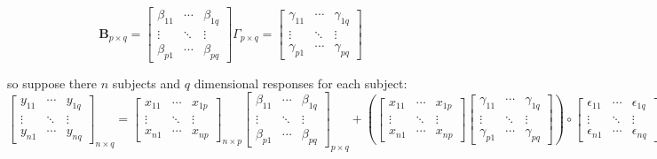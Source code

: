 \documentclass{article}
\begin{document}
\begin{displaymath}
\bm{B}_{p\times q} = 
\begin{bmatrix}
\beta_{11}& \cdots & \beta_{1q} \\
\vdots & \ddots & \vdots \\
\beta_{p1} & \cdots & \beta_{pq}
\end{bmatrix}
\Gamma_{p\times q} = 
\begin{bmatrix}
\gamma_{11} & \cdots & \gamma_{1q} \\
\vdots & \ddots & \vdots \\
\gamma_{p1} & \cdots & \gamma_{pq}
\end{bmatrix}
\end{displaymath}

so suppose there $n$ subjects and $q$ dimensional responses for each
subject: 
\begin{displaymath}
\begin{bmatrix}
y_{11} &\cdots & y_{1q} \\
\vdots & \ddots & \vdots \\
y_{n1} & \cdots & y_{nq} 
\end{bmatrix}_{n\times q}
 = 
\begin{bmatrix}
x_{11} &\cdots & x_{1p} \\
\vdots & \ddots & \vdots \\
x_{n1} & \cdots & x_{np} 
\end{bmatrix}_{n\times p}
\begin{bmatrix}
\beta_{11} &\cdots & \beta_{1q} \\
\vdots & \ddots & \vdots \\
\beta_{p1} & \cdots & \beta_{pq} 
\end{bmatrix}_{p\times q}
+ 
\left( \begin{bmatrix}
x_{11} &\cdots & x_{1p} \\
\vdots & \ddots & \vdots \\
x_{n1} & \cdots & x_{np} 
\end{bmatrix}
\begin{bmatrix}
\gamma_{11} &\cdots & \gamma_{1q} \\
\vdots & \ddots & \vdots \\
\gamma_{p1} & \cdots & \gamma_{pq} 
\end{bmatrix}
 \right)
\circ
\begin{bmatrix}
\epsilon_{11} &\cdots & \epsilon_{1q} \\
\vdots & \ddots & \vdots \\
\epsilon_{n1} & \cdots & \epsilon_{nq} 
\end{bmatrix}_{n\times q}
\end{displaymath}
\end{document}
